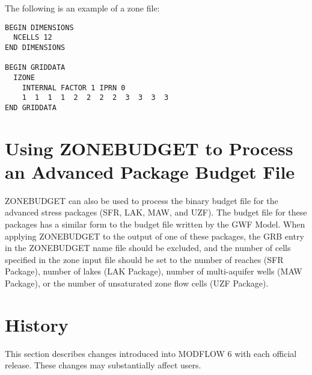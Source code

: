\documentclass[11pt,twoside,twocolumn]{usgsreport}
\begin{document}
The following is an example of a zone file:

\begin{verbatim}
BEGIN DIMENSIONS
  NCELLS 12
END DIMENSIONS

BEGIN GRIDDATA
  IZONE
    INTERNAL FACTOR 1 IPRN 0
    1  1  1  1  2  2  2  2  3  3  3  3
END GRIDDATA
\end{verbatim}

\section{Using ZONEBUDGET to Process an Advanced Package Budget File}
ZONEBUDGET can also be used to process the binary budget file for the advanced stress packages (SFR, LAK, MAW, and UZF).  The budget file for these packages has a similar form to the budget file written by the GWF Model.  When applying ZONEBUDGET to the output of one of these packages, the GRB entry in the ZONEBUDGET name file should be excluded, and the number of cells specified in the zone input file should be set to the number of reaches (SFR Package), number of lakes (LAK Package), number of multi-aquifer wells (MAW Package), or the number of unsaturated zone flow cells (UZF Package).  

\section{History}
This section describes changes introduced into MODFLOW 6 with each official release.  These changes may substantially affect users.
\end{document}

